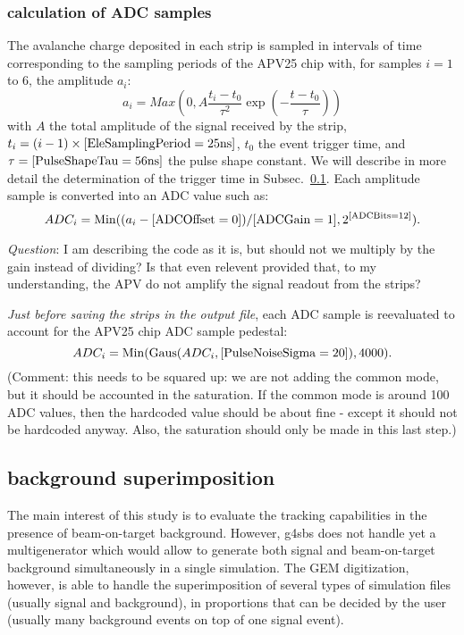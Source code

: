 \subsubsection{calculation of ADC samples}
\label{adc_samp}

The avalanche charge deposited in each strip is sampled in intervals of time corresponding to the sampling periods of the APV25 chip  with, for samples $i = 1$ to 6, the amplitude $a_i$:
%
\begin{equation}
  a_i = Max(0, A \frac{t_i-t_0}{\tau^2} \exp(-\frac{t-t_0}{\tau}) )
  \label{pulseshape_eq}
\end{equation}
%
with $A$ the total amplitude of the signal received by the strip, $t_i = (i-1) \times [{\rm EleSamplingPeriod} = 25 {\rm ns}]$, $t_0$ the event trigger time, and $\tau = [{\rm PulseShapeTau} = 56 {\rm ns}]$ the pulse shape constant.
We will describe in more detail the determination of the trigger time in Subsec.~\ref{bkgd_superimp}.
Each amplitude sample is converted into an ADC value such as:
%
\begin{equation}
  ADC_i = {\rm Min}((a_i-[{\rm ADCOffset} = 0])/[{\rm ADCGain} = 1], 2^{[{\rm ADCBits} = 12]}).
\end{equation}
%
\begin{myindentpar}{2.5cm}
{\it Question}: I am describing the code as it is, but should not we multiply by the gain instead of dividing? Is that even relevent provided that, to my understanding, the APV do not amplify the signal readout from the strips?
\end{myindentpar}
{\it Just before saving the strips in the output file}, each ADC sample is reevaluated to account for the APV25 chip ADC sample pedestal:
%
\begin{equation}
  ADC_i = {\rm Min}({\rm Gaus}(ADC_i, [{\rm PulseNoiseSigma} = 20]) , 4000).
\end{equation}
%
(Comment: this needs to be squared up: we are not adding the common mode, but it should be accounted in the saturation. If the common mode is around 100 ADC values, then the hardcoded value should be about fine - except it should not be hardcoded anyway. Also, the saturation should only be made in this last step.)

\subsection{background superimposition}
\label{bkgd_superimp}
The main interest of this study is to evaluate the tracking capabilities in the presence of beam-on-target background. However, g4sbs does not handle yet a multigenerator which would allow to generate both signal and beam-on-target background simultaneously in a single simulation.
The GEM digitization, however, is able to handle the superimposition of several types of simulation files (usually signal and background), in proportions that can be decided by the user (usually many background events on top of one signal event).

